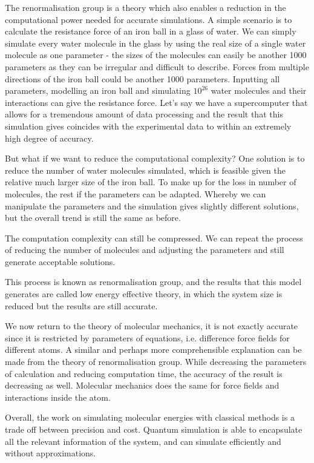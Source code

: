 \documentclass[12pt]{article}
\begin{document}
The renormalisation group is a theory which also enables a reduction in the computational power needed for accurate simulations. A simple scenario
is to calculate the resistance force of an iron ball in a glass of water. We can simply simulate every water molecule in the glass by using the
 real size of a single water molecule as one parameter - the sizes of the molecules can easily be another 1000 parameters as they can be
 irregular and difficult to describe. Forces from multiple directions of the iron ball could be another 1000 parameters. Inputting all parameters,
  modelling an iron ball and simulating $10^{26}$ water molecules and their interactions can give the resistance force. Let’s say we have a
  supercomputer that allows for a tremendous amount of data processing and the result that this simulation gives coincides with the experimental data
  to within an extremely high degree of accuracy.

But what if we want to reduce the computational complexity? One solution is to reduce the number of water molecules simulated, which is feasible given
 the relative much larger size of the iron ball. To make up for the loss in number of molecules, the rest if the parameters can be adapted. Whereby we
can manipulate the parameters and the simulation gives slightly different solutions, but the overall trend is still the same as before.

The computation complexity can still be compressed. We can repeat the process of reducing the number of molecules and adjusting the parameters
 and still generate acceptable solutions.

This process is known as renormalisation group, and the results that this model generates are called low energy effective theory, in which the system
 size is reduced but the results are still accurate.

We now return to the theory of molecular mechanics, it is not exactly accurate since it is restricted by parameters of equations, i.e. difference
force fields for different atoms. A similar and perhaps more comprehensible explanation can be made from the theory of renormalisation group.
While decreasing the parameters of calculation and reducing computation time, the accuracy of the result is decreasing as well. Molecular mechanics
 does the same for force fields and interactions inside the atom.

Overall, the work on simulating molecular energies with classical methods is a trade off between precision and cost. Quantum simulation is able
to encapsulate all the relevant information of the system, and can simulate efficiently and without approximations.
\end{document}
